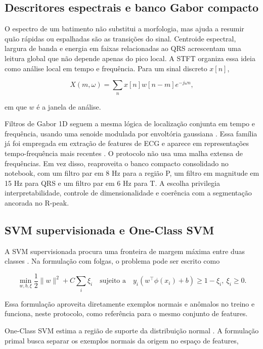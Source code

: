 \subsection{Descritores espectrais e banco Gabor compacto}

O espectro de um batimento não substitui a morfologia, mas ajuda a resumir quão
rápidas ou espalhadas são as transições do sinal. Centroide espectral, largura
de banda e energia em faixas relacionadas ao QRS acrescentam uma leitura global
que não depende apenas do pico local. A STFT organiza essa ideia como análise
local em tempo e frequência. Para um sinal discreto \(x[n]\),

\[
X(m,\omega)=\sum_n x[n]w[n-m]e^{-j\omega n},
\]

em que \(w\) é a janela de análise.

Filtros de Gabor 1D seguem a mesma lógica de localização conjunta em tempo e
frequência, usando uma senoide modulada por envoltória gaussiana
\citep{gabor1946theory}. Essa família já foi empregada em extração de features
de ECG \citep{lee2012gabor} e aparece em representações tempo-frequência mais
recentes \citep{eltrass2021cqgabor}. O protocolo não usa uma malha extensa de
frequências. Em vez disso, reaproveita o banco compacto consolidado no notebook,
com um filtro par em 8 Hz para a região P, um filtro em magnitude em 15 Hz para
QRS e um filtro par em 6 Hz para T. A escolha privilegia interpretabilidade,
controle de dimensionalidade e coerência com a segmentação ancorada no R-peak.

\subsection{SVM supervisionada e One-Class SVM}

A SVM supervisionada procura uma fronteira de margem máxima entre duas classes
\citep{cortes1995support}. Na formulação com folgas, o problema pode ser escrito
como

\[
\min_{w,b,\xi}\frac{1}{2}\|w\|^2 + C\sum_i \xi_i
\quad
\text{sujeito a}
\quad
y_i\left(w^\top \phi(x_i)+b\right)\geq 1-\xi_i,\ \xi_i\geq 0.
\]

Essa formulação aproveita diretamente exemplos normais e anômalos no treino e
funciona, neste protocolo, como referência para o mesmo conjunto de features.

One-Class SVM estima a região de suporte da distribuição normal
\citep{scholkopf2001support}. A formulação primal busca separar os exemplos
normais da origem no espaço de features,

